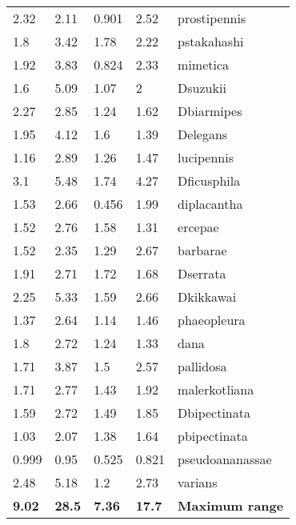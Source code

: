 \begin{tabular}{lllll}
           2.32 &            2.11 &           0.901 &            2.52 &            prostipennis \\
            1.8 &            3.42 &            1.78 &            2.22 &             pstakahashi \\
           1.92 &            3.83 &           0.824 &            2.33 &                mimetica \\
            1.6 &            5.09 &            1.07 &               2 &                Dsuzukii \\
           2.27 &            2.85 &            1.24 &            1.62 &              Dbiarmipes \\
           1.95 &            4.12 &             1.6 &            1.39 &                Delegans \\
           1.16 &            2.89 &            1.26 &            1.47 &              lucipennis \\
            3.1 &            5.48 &            1.74 &            4.27 &             Dficusphila \\
           1.53 &            2.66 &           0.456 &            1.99 &             diplacantha \\
           1.52 &            2.76 &            1.58 &            1.31 &                 ercepae \\
           1.52 &            2.35 &            1.29 &            2.67 &                barbarae \\
           1.91 &            2.71 &            1.72 &            1.68 &                Dserrata \\
           2.25 &            5.33 &            1.59 &            2.66 &               Dkikkawai \\
           1.37 &            2.64 &            1.14 &            1.46 &             phaeopleura \\
            1.8 &            2.72 &            1.24 &            1.33 &                    dana \\
           1.71 &            3.87 &             1.5 &            2.57 &               pallidosa \\
           1.71 &            2.77 &            1.43 &            1.92 &           malerkotliana \\
           1.59 &            2.72 &            1.49 &            1.85 &            Dbipectinata \\
           1.03 &            2.07 &            1.38 &            1.64 &            pbipectinata \\
          0.999 &            0.95 &           0.525 &           0.821 &         pseudoananassae \\
           2.48 &            5.18 &             1.2 &            2.73 &                 varians \\
 \textbf{ 9.02} &  \textbf{ 28.5} &  \textbf{ 7.36} &  \textbf{ 17.7} &  \textbf{Maximum range} \\
\bottomrule
\end{tabular}

